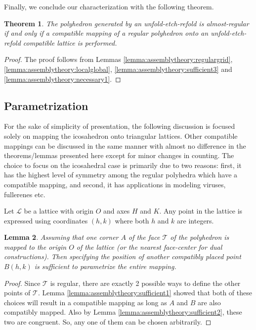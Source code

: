 \documentclass[11pt]{article}
\newtheorem{thm}{Theorem}[section]
\newtheorem{lemma}[thm]{Lemma}
\newcommand{\1}{\mathds{1}}
\begin{document}
Finally, we conclude our characterization with the following theorem.

\begin{thm}
\label{thm:assemblytheory:characterization}
 The polyhedron generated by an unfold-etch-refold is \emph{almost-regular} if and only if a compatible mapping of a regular polyhedron onto an unfold-etch-refold compatible lattice is performed.
\end{thm}

\begin{proof}
The proof follows from Lemmas \ref{lemma:assemblytheory:regulargrid}, \ref{lemma:assemblytheory:localglobal}, \ref{lemma:assemblytheory:sufficient3} and \ref{lemma:assemblytheory:necessary1}.
\end{proof}


\subsection{Parametrization}
\label{sec:assemblytheory:combinatorics}
For the sake of simplicity of presentation, the following discussion is focused solely on mapping the icosahedron onto triangular lattices. Other compatible mappings can be discussed in the same manner with almost no difference in the theorems/lemmas presented here except for minor changes in counting. The choice to focus on the icosahedral case is primarily due to two reasons: first, it has the highest level of symmetry among the regular polyhedra which have a compatible mapping, and second, it has applications in modeling viruses, fullerenes etc. 

Let $\mathcal{L}$ be a lattice with origin $O$ and axes $H$ and $K$. Any point in the lattice is expressed using coordinates $(h,k)$ where both $h$ and $k$ are integers.

\begin{lemma}
 Assuming that one corner $A$ of the face $\mathcal{T}$ of the polyhedron is mapped to the origin $O$ of the lattice (or the nearest face-center for dual constructions). Then specifying the position of another compatibly placed point $B(h,k)$ is sufficient to parametrize the entire mapping. 
\end{lemma}

\begin{proof}
 Since $\mathcal{T}$ is regular, there are exactly 2 possible ways to define the other points of $\mathcal{T}$. Lemma \ref{lemma:assemblytheory:sufficient1} showed that both of these choices will result in a compatible mapping as long as $A$ and $B$ are also compatibly mapped. Also by Lemma \ref{lemma:assemblytheory:sufficient2}, these two are congruent. So, any one of them can be chosen arbitrarily.
\end{proof}
\end{document}
